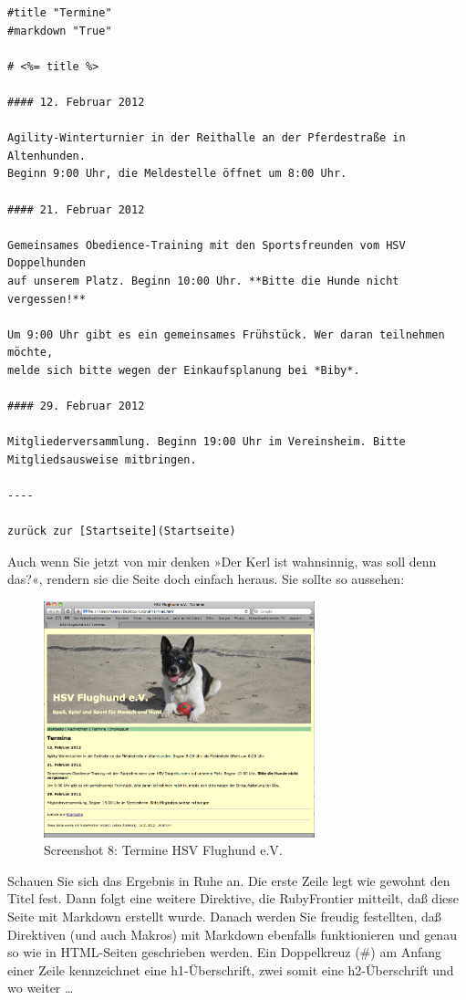 \documentclass[11pt]{report}
\begin{document}
\begin{verbatim}
#title "Termine"
#markdown "True"

# <%= title %>

#### 12. Februar 2012

Agility-Winterturnier in der Reithalle an der Pferdestraße in Altenhunden.
Beginn 9:00 Uhr, die Meldestelle öffnet um 8:00 Uhr.

#### 21. Februar 2012

Gemeinsames Obedience-Training mit den Sportsfreunden vom HSV Doppelhunden
auf unserem Platz. Beginn 10:00 Uhr. **Bitte die Hunde nicht vergessen!**

Um 9:00 Uhr gibt es ein gemeinsames Frühstück. Wer daran teilnehmen möchte,
melde sich bitte wegen der Einkaufsplanung bei *Biby*.

#### 29. Februar 2012

Mitgliederversammlung. Beginn 19:00 Uhr im Vereinsheim. Bitte
Mitgliedsausweise mitbringen.

----

zurück zur [Startseite](Startseite)
\end{verbatim}

Auch wenn Sie jetzt von mir denken »Der Kerl ist wahnsinnig, was soll
denn das?«, rendern sie die Seite doch einfach heraus. Sie sollte so
aussehen:

\begin{figure}[h!]
\centering
\includegraphics[width=0.7\textwidth]{./images/flughund08.png}
\caption{\label{flughund08}Screenshot 8: Termine HSV Flughund e.V.}
\end{figure}


Schauen Sie sich das Ergebnis in Ruhe an. Die erste Zeile legt wie
gewohnt den Titel fest. Dann folgt eine weitere Direktive, die
RubyFrontier mitteilt, daß diese Seite mit Markdown erstellt
wurde. Danach werden Sie freudig festellten, daß Direktiven (und auch
Makros) mit Markdown ebenfalls funktionieren und genau so wie in
HTML-Seiten geschrieben werden. Ein Doppelkreuz (\#) am Anfang einer
Zeile kennzeichnet eine h1-Überschrift, zwei somit eine h2-Überschrift
und wo weiter …
\end{document}
